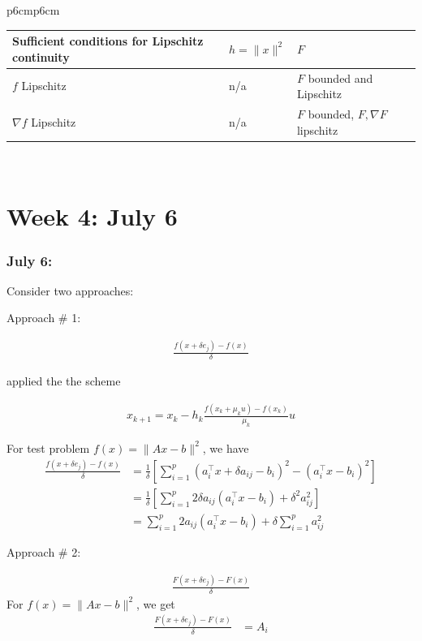\documentclass{article}
\begin{document}
\begin{tabular}{p{6cm}p{6cm}}
        \begin{tabular}{lll}
        \toprule
        Sufficient conditions for Lipschitz continuity & $h = \|x\|^2$ & $F$ \\
        \midrule
        $f$ Lipschitz & n/a & $F$ bounded and Lipschitz \\
        $\nabla f$ Lipschitz & n/a & $F$ bounded, $F, \nabla F$ lipschitz \\
        \bottomrule
        \end{tabular}
        \\[5em]
        
       
   \end{tabular}
   
\section{Week 4: July 6}
   
\subsubsection{July 6:}  

Consider two approaches: \newline 



Approach \# 1: 

\begin{align} \frac{f(x+\delta e_j) - f(x)}{\delta} \end{align} 

applied the the scheme 

\begin{align}
x_{k+1} = x_k - h_k\frac{f(x_k+\mu_ku) - f(x_k)}{\mu_k}u
\end{align}

For test problem $f(x) = \|Ax-b\|^2$, we have 
\begin{align}
\frac{f(x+\delta e_j) - f(x)}{\delta} & = \frac{1}{\delta}\left[\sum_{i=1}^{p}(a_i^\top x + \delta a_{ij} - b_i)^2 - (a_i^\top x - b_i)^2\right] \\ & = \frac{1}{\delta}\left[\sum_{i=1}^p2\delta a_{ij}(a_i^\top x - b_i) + \delta^2 a_{ij}^2\right] \\ & = \sum_{i=1}^p 2a_{ij}(a_i^\top x - b_i) + \delta \sum_{i=1}^pa_{ij}^2
\end{align}

Approach \# 2:

\begin{align}
\frac{F(x+\delta e_j) - F(x)}{\delta }
\end{align}
For $f(x) = \|Ax-b\|^2$, we get 
 \begin{align}
\frac{F(x+\delta e_j) - F(x)}{\delta } & = A_i
\end{align}
\end{document}
